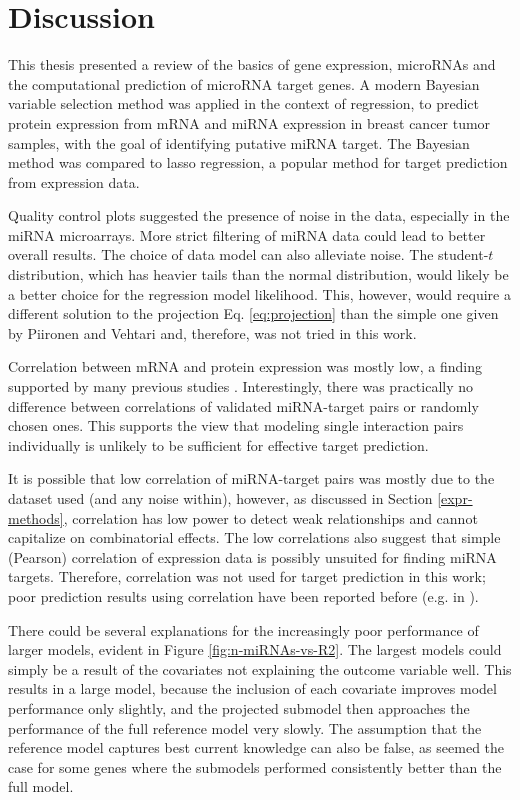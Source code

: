 
\section{Discussion}

This thesis presented a review of the basics of gene expression, microRNAs and
the computational prediction of microRNA target genes. A modern Bayesian
variable selection method was applied in the context of regression, to predict
protein expression from mRNA and miRNA expression in breast cancer tumor
samples, with the goal of identifying putative miRNA target. The Bayesian
method was compared to lasso regression, a popular method for target
prediction from expression data.

Quality control plots suggested the presence of noise in the data, especially
in the miRNA microarrays. More strict filtering of miRNA data could lead to
better overall results. The choice of data model can also alleviate noise. The
student-$t$ distribution, which has heavier tails than the normal
distribution, would likely be a better choice for the regression model
likelihood. This, however, would require a different solution to the
projection Eq. \eqref{eq:projection} than the simple one given by Piironen
and Vehtari \citep{Piironen2015} and, therefore, was not tried in this work.

Correlation between mRNA and protein expression was mostly low, a finding
supported by many previous studies \citep{Payne2015}. Interestingly, there was
practically no difference between correlations of validated miRNA-target pairs
or randomly chosen ones. This supports the view that modeling single
interaction pairs individually is unlikely to be sufficient for effective target
prediction.

It is possible that low correlation of miRNA-target pairs was mostly due to the
dataset used (and any noise within), however, as discussed in Section \ref{expr-methods},
correlation has low power to detect weak relationships and
cannot capitalize on combinatorial effects. The low correlations also suggest
that simple (Pearson) correlation of expression data is possibly unsuited for
finding miRNA targets.  Therefore, correlation was not used for target
prediction in this work; poor prediction results using correlation have been
reported before (e.g. in
\citep{Muniategui2012}).

There could be several explanations for the increasingly poor performance of
larger models, evident in Figure \ref{fig:n-miRNAs-vs-R2}. The largest models
could simply be a result of the covariates not explaining the outcome variable
well. This results in a large model, because the inclusion of each covariate
improves model performance only slightly, and the projected submodel then
approaches the performance of the full reference model very slowly. The
assumption that the reference model captures best current knowledge can also be
false, as seemed the case for some genes where the submodels performed 
consistently better than the full model.

